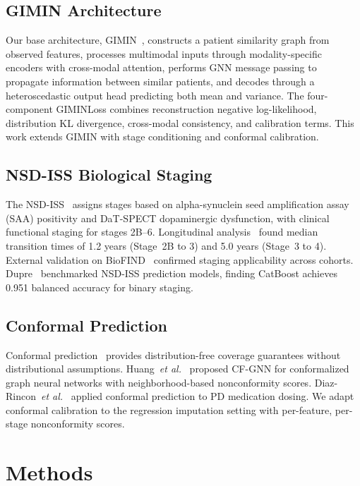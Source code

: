 \subsection{GIMIN Architecture}
Our base architecture, GIMIN~\cite{dupre2025gimin}, constructs a patient similarity graph from observed features, processes multimodal inputs through modality-specific encoders with cross-modal attention, performs GNN message passing to propagate information between similar patients, and decodes through a heteroscedastic output head predicting both mean and variance. The four-component GIMINLoss combines reconstruction negative log-likelihood, distribution KL divergence, cross-modal consistency, and calibration terms. This work extends GIMIN with stage conditioning and conformal calibration.

\subsection{NSD-ISS Biological Staging}
The NSD-ISS~\cite{simuni2024} assigns stages based on alpha-synuclein seed amplification assay (SAA) positivity and DaT-SPECT dopaminergic dysfunction, with clinical functional staging for stages 2B--6. Longitudinal analysis~\cite{simuni2025} found median transition times of 1.2 years (Stage~2B to 3) and 5.0 years (Stage~3 to 4). External validation on BioFIND~\cite{russo2025} confirmed staging applicability across cohorts. Dupre~\cite{dupre2025bench} benchmarked NSD-ISS prediction models, finding CatBoost achieves 0.951 balanced accuracy for binary staging.

\subsection{Conformal Prediction}
Conformal prediction~\cite{vovk2022} provides distribution-free coverage guarantees without distributional assumptions. Huang~\textit{et al.}~\cite{huang2023} proposed CF-GNN for conformalized graph neural networks with neighborhood-based nonconformity scores. Diaz-Rincon~\textit{et al.}~\cite{diazrincon2025} applied conformal prediction to PD medication dosing. We adapt conformal calibration to the regression imputation setting with per-feature, per-stage nonconformity scores.

\section{Methods}
\label{p2:sec:methods}

